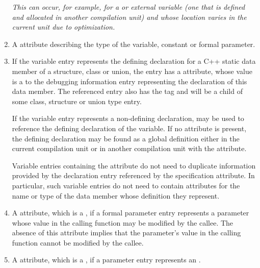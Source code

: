 \begin{enumerate}[1. ]
\textit{This can occur, for example, for a 
or  external variable (one that is defined
and allocated in another compilation unit) and whose location
varies in the current unit due to optimization.}
\db

\item A \DWATtype{} attribute describing the type of the variable,
constant or formal parameter.

\item If the variable entry represents the defining declaration
for a C++ static data member of a structure, class or union,
the entry has a \DWATspecification{} attribute, whose value is a
 to the debugging information
entry representing the declaration of this data member. The referenced
entry also has the tag \DWTAGvariable{}
and will be a child of some class, structure or union type entry.

If the variable entry represents a
non-defining declaration, \DWATspecification{} may be used
to reference the defining declaration of the variable. If
no \DWATspecification{} attribute is present, the defining
declaration may be found as a global definition either in the
current compilation unit or in another compilation unit with
the \DWATexternal{} attribute.

Variable entries containing
the \DWATspecification{} attribute do not need to duplicate
information provided by the declaration entry referenced by
the specification attribute. In particular, such variable
entries do not need to contain attributes for the name or
type of the data member whose definition they represent.

\item \hypertarget{chap:DWATvariableparameternonconstantparameterflag}{}
A \DWATvariableparameterDEFN{}
attribute,
which is a ,
if a formal parameter entry represents a parameter whose
value in the calling function may be modified by the callee.
The absence of this attribute implies that the parameter\textquoteright s
value in the calling function cannot be modified by the callee.

\item \hypertarget{chap:DWATisoptionaloptionalparameter}{}
A \DWATisoptionalDEFN{} attribute,
which is a , if a
parameter entry represents an .


\end{enumerate}
